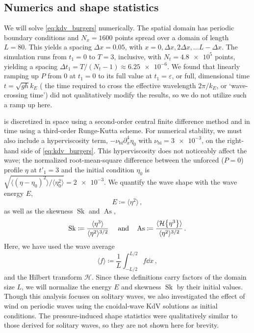 \documentclass{jfm}
\DeclareMathOperator{\Sk}{Sk}
\DeclareMathOperator{\As}{As}
\newcommand{\hilbert}{\mathcal{H}}
\renewcommand*{\epsilon}{\varepsilon}
\begin{document}
\subsection{Numerics and shape statistics}
We will solve \cref{eq:kdv_burgers} numerically.
The spatial domain has periodic boundary conditions and $N_x = 1600$
points spread over a domain of length $L = 80$.
This yields a spacing $\Delta x = 0.05$, with $x = 0, \Delta x,
2\Delta x, \ldots L - \Delta x$.
The simulation runs from $t_1 = 0$ to $T = 3$, inclusive, with
$N_t = \num{4.8e5}$ points, yielding a spacing $\Delta t_1 = T/(N_t-1)
\approx \num{6.25e-6}$.
We found that linearly ramping up $P$ from $0$ at $t_1=0$ to its full
value at $t_1 = \epsilon$, or full, dimensional time $t = \sqrt{gh} k_E$
(\ie{} the time required to cross the effective wavelength $2\pi/k_E$,
or `wave-crossing time') did not qualitatively modify the results, so we
do not utilize such a ramp up here.

 is discretized in space using a
second-order central finite difference method and in time using a
third-order Runge-Kutta scheme.
For numerical stability, we must also include a hyperviscosity term,
$-\nu_{\text{bi}} \partial_x^4 \eta_0$ with $\nu_{\text{bi}} =
\num{3e-3}$, on the right-hand side of \cref{eq:kdv_burgers}.
This hyperviscosity does not noticeably affect the wave; the normalized
root-mean-square difference between the unforced ($P=0$) profile $\eta$
at $t'_1=3$ and the initial condition $\eta_0$ is $\sqrt{\langle (\eta -
\eta_0)^2 \rangle/ \langle \eta_0^2 \rangle} = \num{2e-3}$.
We quantify the wave shape with the wave energy $E$,
\begin{equation}
  E \coloneqq \langle \eta^2 \rangle \,,
  \label{eq:energy_def}
\end{equation}
as well as the skewness $\Sk$ and $\As$,
\begin{equation}
  \Sk \coloneqq \frac{\langle \eta^3 \rangle}{\langle \eta^2
  \rangle^{3/2}} \
  \qq{and}
  \As \coloneqq \frac{\langle \hilbert \Bqty{\eta^3} \rangle}{\langle
    \eta^2 \rangle^{3/2}} \,.
  \label{eq:shape_stats_def}
\end{equation}
Here, we have used the wave average
\begin{equation}
  \langle f \rangle \coloneqq \frac{1}{L} \int_{-L/2}^{L/2} f
  \dd{x} \,,
\end{equation}
and the Hilbert transform $\hilbert$.
Since these definitions carry factors of the domain size $L$, we will
normalize the energy $E$ and skewness $\Sk$ by their initial values.
Though this analysis focuses on solitary waves, we also investigated the
effect of wind on periodic waves using the cnoidal-wave KdV solutions as
initial conditions.
The pressure-induced shape statistics were qualitatively similar to
those derived for solitary waves, so they are not shown here for
brevity.
\end{document}
